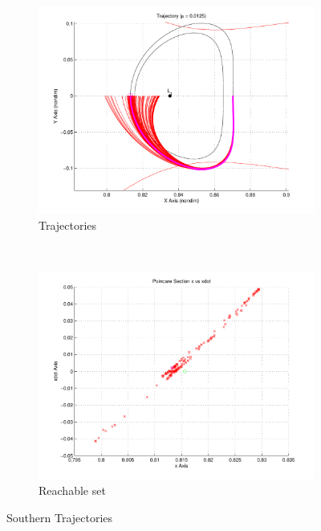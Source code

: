 \begin{figure}[htbp]
        	\centering
        	\begin{subfigure}[b]{0.49\textwidth}
        		\includegraphics[width=\columnwidth]{figures/2015_SSPI/south_reach_trajectory}
        		\caption{Trajectories}
        		\label{fig:south_trajectory}
        	\end{subfigure}
			~
			\begin{subfigure}[b]{0.49\textwidth}
        		\includegraphics[width=\columnwidth]{figures/2015_SSPI/south_reach_poincare}
        		\caption{Reachable set }
        		\label{fig:south_poincare_reach}
        	\end{subfigure}
	\caption{Southern Trajectories}\label{fig:south_reach}
        \end{figure}	        
